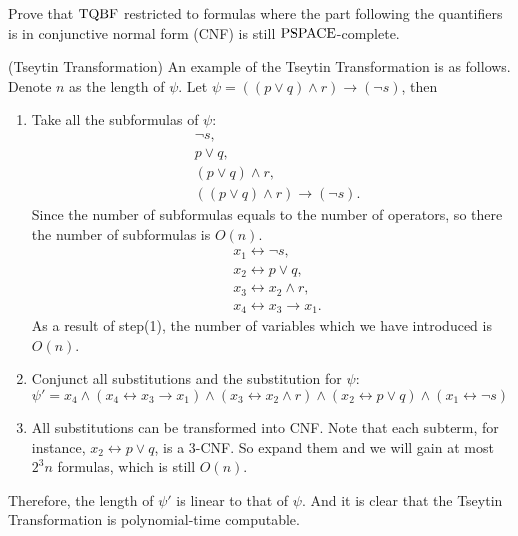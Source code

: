 \documentclass{homework}
\begin{document}



\begin{problem}
  Prove that $\mathrm{TQBF}$ restricted to formulas where the part following the
  quantifiers is in conjunctive normal form (CNF) is still $\textup{PSPACE}$-complete.
\end{problem}

\begin{lemma}
  (Tseytin Transformation)
  An example of the Tseytin Transformation is as follows.
  Denote $n$ as the length of $\psi$.
  Let $\psi = ((p \lor q) \land r) \to (\lnot s)$, then

  \begin{enumerate}
    \item Take all the subformulas of $\psi$:
          \begin{align*}
            &\lnot s, \\
            &p \lor q, \\
            &(p \lor q) \land r, \\
            &((p \lor q) \land r) \to (\lnot s).
          \end{align*}
          Since the number of subformulas equals to the number of operators,
          so there the number of subformulas is $O(n)$.
          \begin{align*}
            & x_1 \leftrightarrow \lnot s, \\
            & x_2 \leftrightarrow p \lor q, \\
            & x_3 \leftrightarrow x_2 \land r, \\
            & x_4 \leftrightarrow x_3 \to x_1.
          \end{align*}
          As a result of step(1), the number of variables which we have
          introduced is $O(n)$.
    \item Conjunct all substitutions and the substitution for $\psi$:
          $\psi' = x_4 \land (x_4 \leftrightarrow x_3 \to x_1) \land (x_3 \leftrightarrow x_2 \land r) \land (x_2 \leftrightarrow p \lor q) \land (x_1 \leftrightarrow \lnot s)$
    \item All substitutions can be transformed into CNF.
          Note that each subterm, for instance, $x_2 \leftrightarrow p \lor q$,
          is a 3-CNF. So expand them and we will gain at most $2^3 n$ formulas,
          which is still $O(n)$.
  \end{enumerate}
  Therefore, the length of $\psi'$ is linear to that of $\psi$.
  And it is clear that the Tseytin Transformation is polynomial-time computable.
\end{lemma}
\end{document}
